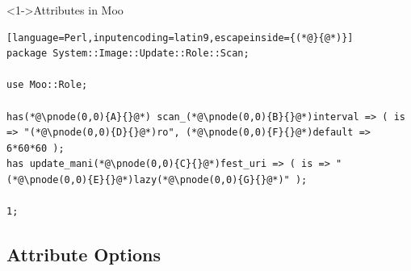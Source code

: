 \documentclass[ngerman,xcolor={table,dvipsnames},smaller,compress,hyperref={bookmarks,colorlinks}]{beamer}%
\begin{document}
\begin{frame}[t,fragile]

\begin{block}<1->{Attributes in Moo}
\scriptsize
\begin{lstlisting}[language=Perl,inputencoding=latin9,escapeinside={(*@}{@*)}]
package System::Image::Update::Role::Scan;

use Moo::Role;

has(*@\pnode(0,0){A}{}@*) scan_(*@\pnode(0,0){B}{}@*)interval => ( is => "(*@\pnode(0,0){D}{}@*)ro", (*@\pnode(0,0){F}{}@*)default => 6*60*60 );
has update_mani(*@\pnode(0,0){C}{}@*)fest_uri => ( is => "(*@\pnode(0,0){E}{}@*)lazy(*@\pnode(0,0){G}{}@*)" );

1;
\end{lstlisting}
\end{block}

\begin{itemize}
\end{itemize}

\end{frame}

\subsection{Attribute Options}
\end{document}
